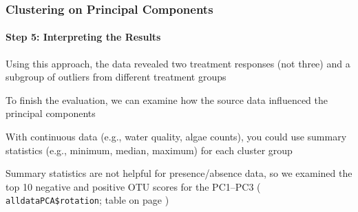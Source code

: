 \documentclass[10pt]{beamer}
\begin{document}


\begin{frame}[fragile]
\frametitle{Clustering on Principal Components}
\framesubtitle{Step 5: Interpreting the Results}

\bi
\item Using this approach, the data revealed two treatment
  responses (not three) and a subgroup of outliers from different treatment groups

\item To finish the evaluation, we can examine how the source data
  influenced the principal components

\item With continuous data (e.g., water quality, algae counts), you
  could use summary statistics (e.g., minimum, median, maximum) for
  each cluster group

\item Summary statistics are not helpful for presence/absence data, so
  we examined the top 10 negative and positive OTU scores for the PC1--PC3 
  ({\color{red} \tt alldataPCA\$rotation}; table on page
  \pageref{otuscores}) \ei
\end{frame}
\end{document}
